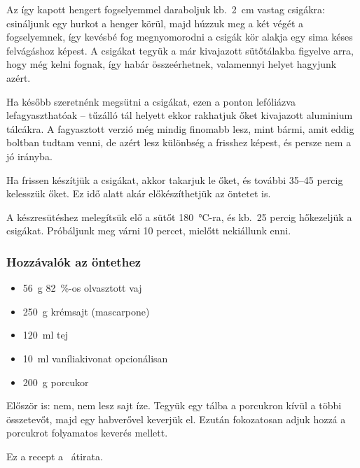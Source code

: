 Az így kapott hengert fogselyemmel daraboljuk kb.~\qty{2}{\cm} vastag csigákra: csináljunk egy hurkot a henger körül, majd húzzuk meg a két végét a fogselyemnek, így kevésbé fog megnyomorodni a csigák kör alakja egy sima késes felvágáshoz képest. A csigákat tegyük a már kivajazott sütőtálakba figyelve arra, hogy még kelni fognak, így habár összeérhetnek, valamennyi helyet hagyjunk azért.

Ha később szeretnénk megsütni a csigákat, ezen a ponton lefóliázva lefagyaszthatóak -- tűzálló tál helyett ekkor rakhatjuk őket kivajazott aluminium tálcákra. A fagyasztott verzió még mindig finomabb lesz, mint bármi, amit eddig boltban tudtam venni, de azért lesz különbség a frisshez képest, és persze nem a jó irányba.

Ha frissen készítjük a csigákat, akkor takarjuk le őket, és további \numrange{35}{45} percig kelesszük őket. Ez idő alatt akár előkészíthetjük az öntetet is.

A készresütéshez melegítsük elő a sütőt \qty{180}{\celsius}-ra, és kb.~\num{25} percig hőkezeljük a csigákat. Próbáljunk meg várni \num{10} percet, mielőtt nekiállunk enni.

\subsubsection*{Hozzávalók az öntethez}
\begin{itemize}
    \item \qty{56}{\g} \qty{82}{\percent}-os olvasztott vaj
    \item \qty{250}{\g} krémsajt (mascarpone)
    \item \qty{120}{\ml} tej
    \item \qty{10}{\ml} vaníliakivonat opcionálisan
    \item \qty{200}{\g} porcukor
\end{itemize}

Először is: nem, nem lesz sajt íze. Tegyük egy tálba a porcukron kívül a többi összetevőt, majd egy habverővel keverjük el. Ezután fokozatosan adjuk hozzá a porcukrot folyamatos keverés mellett.

Ez a recept a~\cite{tasty_fahejas_csiga} átirata.
